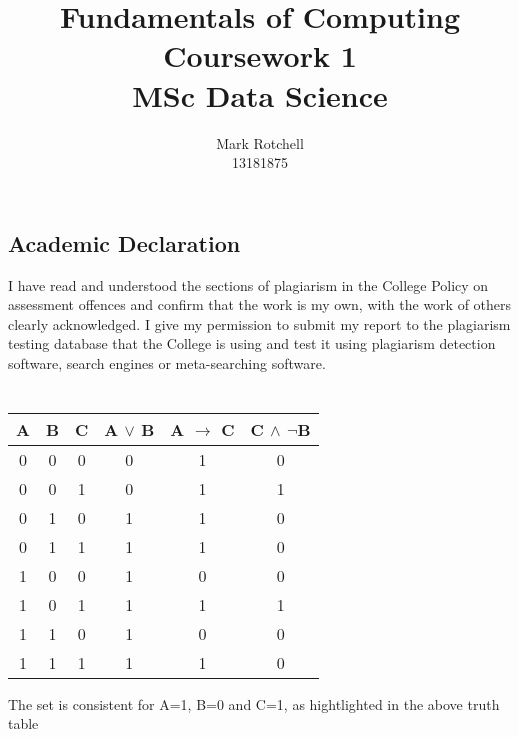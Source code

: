 \documentclass[10pt]{article} %
\title{Fundamentals of Computing \\
      \Large Coursework 1 \\  MSc Data Science}
\author{Mark Rotchell\\13181875}
\date{}
\begin{document}
\maketitle

\pagebreak
\hspace{0pt}
\vfill
\begin{center}
\section*{Academic Declaration}

I have read and understood the sections of plagiarism in the College Policy on assessment offences and confirm that the work is my own, with the work of others clearly acknowledged. I give my permission to submit my report to the plagiarism testing database that the College is using and test it using plagiarism detection software, search engines or meta-searching software.
\end{center}
\vfill
\hspace{0pt}
\pagebreak
\section{}
\subsection{}
\subsubsection{}
\begin{tabular}{c|c|c||c|c|c}
A & B & C & A $\vee$  B & A $\to$ C & C $\wedge$ $\neg$B\\
\hline
0 & 0 & 0 & 0 & 1 & 0 \\
0 & 0 & 1 & 0 & 1 & 1 \\
0 & 1 & 0 & 1 & 1 & 0 \\
0 & 1 & 1 & 1 & 1 & 0 \\
1 & 0 & 0 & 1 & 0 & 0 \\
\rowcolor[HTML]{CCCCCC}
1 & 0 & 1 & 1 & 1 & 1 \\
1 & 1 & 0 & 1 & 0 & 0 \\
1 & 1 & 1 & 1 & 1 & 0 \\
\end{tabular}

\vspace{20px}
The set is consistent for A=1, B=0 and C=1, as hightlighted in the above truth table
\end{document}

